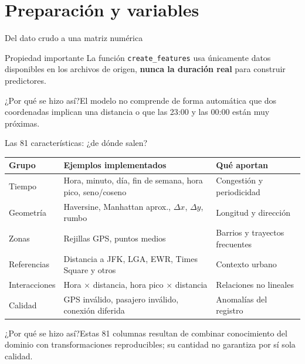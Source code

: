 \documentclass[aspectratio=169,11pt]{beamer}
\newcommand{\porq}[1]{\vspace{1.2mm}\begin{block}{¿Por qué se hizo así?}\small #1\end{block}}
\begin{document}
\section{Preparación y variables}
\begin{frame}{Del dato crudo a una matriz numérica}
\centering
{}
\vspace{8mm}
\begin{block}{Propiedad importante}
La función \texttt{create\_features} usa únicamente datos disponibles en los archivos de origen, \textbf{nunca la duración real} para construir predictores.
\end{block}
\porq{El modelo no comprende de forma automática que dos coordenadas implican una distancia o que las 23:00 y las 00:00 están muy próximas.}
\end{frame}

\begin{frame}{Las 81 características: ¿de dónde salen?}
\footnotesize
\begin{tabular}{p{.25\linewidth}p{.45\linewidth}p{.22\linewidth}}
\toprule
\textbf{Grupo} & \textbf{Ejemplos implementados} & \textbf{Qué aportan}\tabularnewline\midrule
Tiempo & Hora, minuto, día, fin de semana, hora pico, seno/coseno & Congestión y periodicidad\\
Geometría & Haversine, Manhattan aprox., $\Delta x$, $\Delta y$, rumbo & Longitud y dirección\\
Zonas & Rejillas GPS, puntos medios & Barrios y trayectos frecuentes\\
Referencias & Distancia a JFK, LGA, EWR, Times Square y otros & Contexto urbano\\
Interacciones & Hora $\times$ distancia, hora pico $\times$ distancia & Relaciones no lineales\\
Calidad & GPS inválido, pasajero inválido, conexión diferida & Anomalías del registro\\
\bottomrule
\end{tabular}
\porq{Estas 81 columnas resultan de combinar conocimiento del dominio con transformaciones reproducibles; su cantidad no garantiza por sí sola calidad.}
\end{frame}
\end{document}
